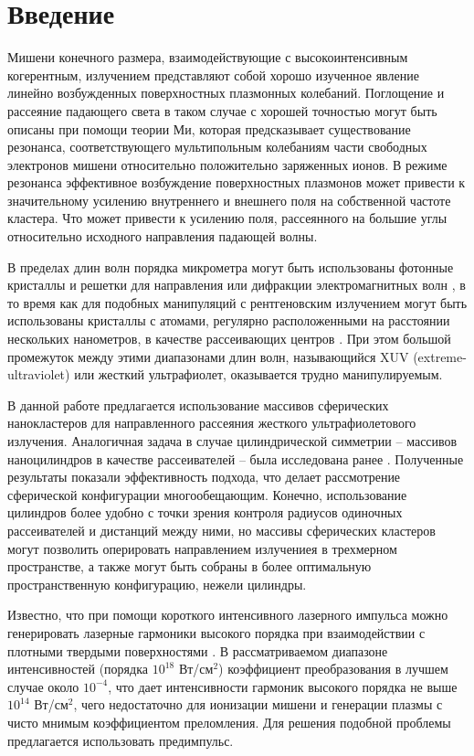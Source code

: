 \section{Введение}

Мишени конечного размера, взаимодействующие с высокоинтенсивным когерентным, излучением представляют собой хорошо изученное явление линейно возбужденных 
поверхностных плазмонных колебаний. Поглощение и рассеяние падающего света в таком случае с хорошей точностью могут быть описаны при помощи теории Ми, которая предсказывает существование резонанса, соответствующего мультипольным колебаниям части свободных электронов мишени относительно положительно заряженных ионов. В режиме резонанса эффективное возбуждение поверхностных плазмонов может привести к значительному усилению внутреннего и внешнего поля на собственной частоте кластера. Что может привести к усилению поля, рассеянного на большие углы относительно исходного направления падающей волны.

В пределах длин волн порядка микрометра могут быть использованы фотонные кристаллы и решетки для направления или дифракции электромагнитных волн \cite{lin_zhang}, в то время как для подобных манипуляций с рентгеновским излучением могут быть использованы кристаллы с атомами, регулярно расположенными на расстоянии нескольких нанометров, в качестве рассеивающих центров \cite{batterman_cole}. При этом большой промежуток между этими диапазонами длин волн, называющийся XUV (extreme-ultraviolet) или жесткий ультрафиолет, оказывается трудно манипулируемым.


В данной работе предлагается использование массивов сферических нанокластеров для направленного рассеяния жесткого ультрафиолетового излучения. Аналогичная задача в случае цилиндрической симметрии -- массивов наноцилиндров в качестве рассеивателей -- была исследована ранее \cite{andreev_lecz}. Полученные результаты показали эффективность подхода, что делает рассмотрение сферической конфигурации многообещающим. Конечно, использование цилиндров более удобно с точки зрения контроля радиусов одиночных рассеивателей и дистанций между ними, но массивы сферических кластеров могут позволить оперировать направлением излучениея в трехмерном пространстве, а также могут быть собраны в более оптимальную пространственную конфигурацию, нежели цилиндры.

Известно, что при помощи короткого интенсивного лазерного импульса можно генерировать лазерные гармоники высокого порядка при взаимодействии с плотными твердыми поверхностями \cite{teubner_gibbon_hoh}. В рассматриваемом диапазоне интенсивностей (порядка $10^{18}$ Вт/см$^2$) коэффициент преобразования в лучшем случае около $10^{-4}$, что дает интенсивности гармоник высокого порядка не выше $10^{14}$ Вт/см$^2$, чего недостаточно для ионизации мишени и генерации плазмы с чисто мнимым коэффициентом преломления. Для решения подобной проблемы предлагается использовать предимпульс.


